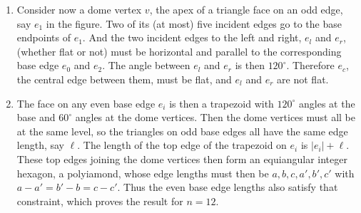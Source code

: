 \documentclass[11pt]{article}
\newcommand{\JOR}[1]{{\color{red} JOR: [#1]}}
\newcommand{\Anna}[1]{{\color{red} Anna: [#1]}}
\begin{document}
\begin{enumerate}[(1)]
By symmetry
of the base vertices, all the red edges have the same dihedral, so if one is nonflat, then they all are.  
What are the 
dome vertices at the other ends of these nonflat red edges? (Note that a red edge cannot go to another base vertex.)
Since there are $12$ red edges and only $6$ dome vertices,
some dome vertex $u$ is an endpoint of at least two red edges. 
As noted above, $u$ is the apex of a downward-normal triangle, so
it 
also has two (different) edges to the endpoints of an odd
base edge. Because $u$ has at most $5$ incident dome triangles, 
it has at most one more incident dome edge
beyond the two red edges and two edges to the base.
This means that two of $u$'s edges separated by $60^\circ$
(thus in one face)
are incident to non-consecutive base vertices. 
But it is impossible for two non-consecutive base vertices to lie in the same dome face.
Thus the red edges cannot end at dome vertices.
Thus they must be flat edges.
The face on any 
even %
base edge then has $120^\circ$ face angles at the base vertices.  We next argue that each such face is a quadrilateral.
%
\item Consider now a dome vertex $v$, the apex of a triangle face on an odd
edge, say $e_1$ in the figure.
Two of its (at most) five incident edges go to the base endpoints of 
$e_1$. 
And the two 
incident edges to the
left and right, $e_l$ and $e_r$,
(whether flat or not) must be horizontal and parallel to the corresponding base edge
$e_0$ and $e_2$.
The angle between $e_l$ and $e_r$ is then $120^\circ$.
Therefore $e_c$, the central edge between them, must be flat, and $e_l$ and $e_r$ are not flat.
%
\item 
The face on any even
base edge $e_i$ is then a trapezoid %
with $120^\circ$ angles at the base and $60^\circ$ angles at the dome vertices.   
Then the dome vertices must all be at the same level, 
so the triangles on odd base edges all have the same edge length, say $\ell$. 
The length of the top edge of the trapezoid on $e_i$ is $|e_i| + \ell$.
These top edges 
joining the dome vertices then form an equiangular integer hexagon, a polyiamond, whose edge lengths must then be $a,b,c,a',b',c'$ with $a-a' = b'-b=c-c'$.  
Thus the 
even  
base edge lengths also satisfy that constraint, which proves the result for $n=12$.
%
\end{enumerate}
\end{document}
